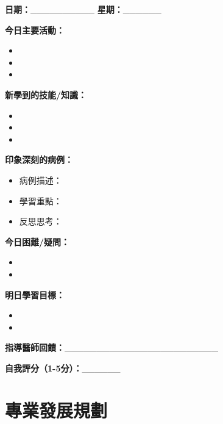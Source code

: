 \documentclass[12pt,a4paper]{article}
\begin{document}
\begin{tcolorbox}[
    colback=emergency_blue!5!white,
    colframe=emergency_blue,
    title=\textbf{每日學習記錄範本},
    fonttitle=\bfseries,
    boxrule=0.5pt,
    arc=3pt
]
\textbf{日期：}\_\_\_\_\_\_\_\_\_\_ \textbf{星期：}\_\_\_\_\_\_

\textbf{今日主要活動：}
\begin{itemize}[nosep]
    \item 
    \item 
    \item 
\end{itemize}

\textbf{新學到的技能/知識：}
\begin{itemize}[nosep]
    \item 
    \item 
    \item 
\end{itemize}

\textbf{印象深刻的病例：}
\begin{itemize}[nosep]
    \item 病例描述：
    \item 學習重點：
    \item 反思思考：
\end{itemize}

\textbf{今日困難/疑問：}
\begin{itemize}[nosep]
    \item 
    \item 
\end{itemize}

\textbf{明日學習目標：}
\begin{itemize}[nosep]
    \item 
    \item 
\end{itemize}

\textbf{指導醫師回饋：}\_\_\_\_\_\_\_\_\_\_\_\_\_\_\_\_\_\_\_\_\_\_\_\_

\textbf{自我評分（1-5分）：}\_\_\_\_\_\_
\end{tcolorbox}

\section{專業發展規劃}
\end{document}
